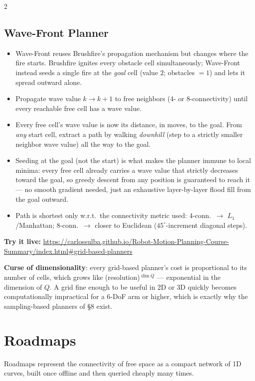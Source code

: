 \documentclass[10pt,a4paper]{article}
\newcommand{\keyterm}[1]{\textbf{#1}}
\newcommand{\demo}[1]{\textbf{Try it live:} \url{#1}}
\begin{document}
\begin{multicols}{2}
\subsection{Wave-Front Planner}
\begin{itemize}
\item Wave-Front reuses Brushfire's propagation mechanism but changes where the fire starts. Brushfire ignites every obstacle cell simultaneously; Wave-Front instead seeds a single fire at the \emph{goal} cell (value $2$; obstacles $=1$) and lets it spread outward alone.
\item Propagate wave value $k\to k{+}1$ to free neighbors (4- or 8-connectivity) until every reachable free cell has a wave value.
\item Every free cell's wave value is now its distance, in moves, to the goal. From \emph{any} start cell, extract a path by walking \emph{downhill} (step to a strictly smaller neighbor wave value) all the way to the goal.
\item Seeding at the goal (not the start) is what makes the planner immune to local minima: every free cell already carries a wave value that strictly decreases toward the goal, so greedy descent from any position is guaranteed to reach it --- no smooth gradient needed, just an exhaustive layer-by-layer flood fill from the goal outward.
\item Path is shortest only w.r.t.\ the connectivity metric used: 4-conn.\ $\to$ $L_1$/Manhattan; 8-conn.\ $\to$ closer to Euclidean ($45^\circ$-increment diagonal steps).
\end{itemize}
\begin{democallout}
\demo{https://carlossulba.github.io/Robot-Motion-Planning-Course-Summary/index.html\#grid-based-planners}
\end{democallout}

\begin{warnbox}
\keyterm{Curse of dimensionality}: every grid-based planner's cost is proportional to its number of cells, which grows like (resolution)$^{\dim Q}$ --- exponential in the dimension of $Q$. A grid fine enough to be useful in 2D or 3D quickly becomes computationally impractical for a 6-DoF arm or higher, which is exactly why the sampling-based planners of \S8 exist.
\end{warnbox}

\section{Roadmaps}
Roadmaps represent the connectivity of free space as a compact network of 1D curves, built once offline and then queried cheaply many times.


\end{multicols}
\end{document}

